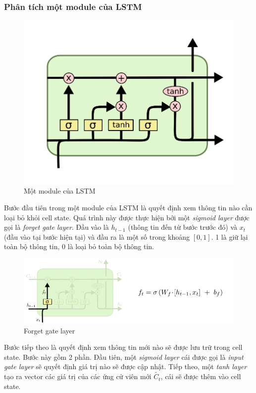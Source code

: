 \documentclass[a4paper,12pt]{report}
\begin{document}
\subsubsection{Phân tích một module của LSTM}
\begin{figure}[H]
\centering
\includegraphics[scale=0.5]{lstm_module.png}
\caption{Một module của LSTM}
\end{figure}
\par Bước đầu tiên trong một module của LSTM là quyết định xem thông tin nào cần loại bỏ khỏi cell state. Quá trình này được thực hiện bởi một \emph{sigmoid layer} được gọi là \emph{forget gate layer}. Đầu vào là $h_{t-1}$ (thông tin đến từ bước trước đó) và $x_t$ (đầu vào tại bước hiện tại) và đầu ra là một số trong khoảng $[0,1]$. 1 là giữ lại toàn bộ thông tin, 0 là loại bỏ toàn bộ thông tin.
\begin{figure}[H]
\centering
\includegraphics[scale=0.5]{lstm_module_firststep.png}
\caption{Forget gate layer}
\end{figure}
\par Bước tiếp theo là quyết định xem thông tin mới nào sẽ được lưu trữ trong cell state. Bước này gồm 2 phần. Đầu tiên, một \emph{sigmoid layer} cái được gọi là \emph{input gate layer} sẽ quyết định giá trị nào sẽ được cập nhật. Tiếp theo, một \emph{tanh layer} tạo ra vector các giá trị của các ứng cử viên mới $\tilde{C_t}$, cái sẽ được thêm vào cell state. 
\end{document}
